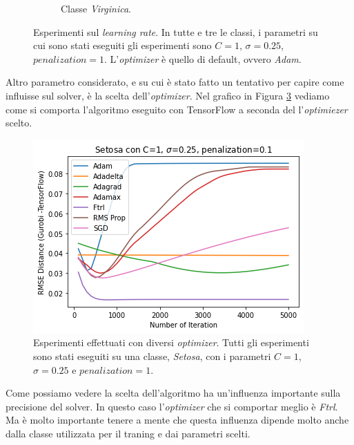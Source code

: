 \documentclass[a4paper,12pt]{report}
\begin{document}
\begin{figure}[H]
\begin{subfigure}{\textwidth}
        \caption{Classe \textit{Virginica}.}
        \label{subfig:Virginica_learning_rate}
    \end{subfigure}
    \caption{Esperimenti sul \textit{learning rate}. In tutte e tre le classi, i parametri su cui sono stati eseguiti gli esperimenti sono $C=1$, $\sigma=0.25$, $\textit{penalization}=1$. L'\textit{optimizer} è quello di default, ovvero \textit{Adam}.}
    \label{fig:esperimenti_learning_rate}
\end{figure}


\noindent Altro parametro considerato, e su cui è stato fatto un tentativo per capire come influisse sul solver, è la scelta dell'\textit{optimizer}. Nel grafico in Figura \ref{fig:different_optimizer} vediamo come si comporta l'algoritmo eseguito con TensorFlow a seconda del l'\textit{optimiezer} scelto.

\begin{figure}[H]
    \centering
    \includegraphics[scale=0.8]{images/Grafici/Different_Optimizer.png}
    \caption{Esperimenti effettuati con diversi \textit{optimizer}. Tutti gli esperimenti sono stati eseguiti su una classe, \textit{Setosa}, con i parametri $C=1$, $\sigma=0.25$ e $\textit{penalization}=1$.}
    \label{fig:different_optimizer}
\end{figure}


\noindent Come possiamo vedere la scelta dell'algoritmo ha un'influenza importante sulla precisione del solver. In questo caso l'\textit{optimizer} che si comportar meglio è \textit{Ftrl}. Ma è molto importante tenere a mente che questa influenza dipende molto anche dalla classe utilizzata per il traning e dai parametri scelti.
\end{document}
